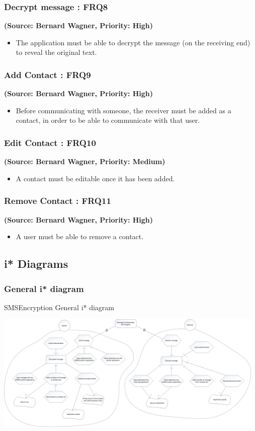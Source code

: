 \subsubsection{Decrypt message : FRQ8}
\textbf{(Source: Bernard Wagner, Priority: High)}
\begin{itemize}
\item The application must be able to decrypt the message (on the receiving end) to reveal the original text.
\end{itemize}
\subsubsection{Add Contact : FRQ9}
\textbf{(Source: Bernard Wagner, Priority: High)}
\begin{itemize}
\item Before communicating with someone, the receiver must be added as a contact, in order to be able to communicate with that user.
\end{itemize}
\subsubsection{Edit Contact : FRQ10}
\textbf{(Source: Bernard Wagner, Priority: Medium)}
\begin{itemize}
\item A contact must be editable once it has been added.
\end{itemize}
\subsubsection{Remove Contact : FRQ11}
\textbf{(Source: Bernard Wagner, Priority: High)}
\begin{itemize}
\item A user must be able to remove a contact.
\end{itemize}


\subsection{i* Diagrams}
\subsubsection{General i* diagram}
SMSEncryption General i* diagram

\begin{center}
 \includegraphics[width=13cm]{diagrams/IStarDiagrams/SMSEncryptionIStarDiagram.png}
\end{center}
